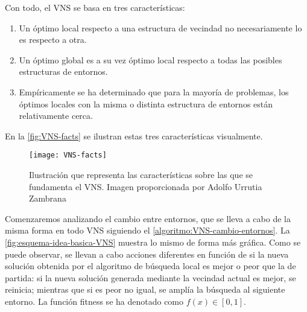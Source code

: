 
Con todo, el VNS se basa en tres características:

\begin{enumerate}
    \item Un óptimo local respecto a una estructura de vecindad no necesariamente lo es respecto a otra.
    \item Un óptimo global es a su vez óptimo local respecto a todas las posibles estructuras de entornos.
    \item Empíricamente se ha determinado que para la mayoría de problemas, los óptimos locales con la misma o distinta estructura de entornos están relativamente cerca.
\end{enumerate}

En la \autoref{fig:VNS-facts} se ilustran estas tres características visualmente.

\begin{figure}
    \centering
    \texttt{[image: VNS-facts]}
    \caption[Ilustración que representa las características sobre las que se fundamenta el VNS]{Ilustración que representa las características sobre las que se fundamenta el VNS. Imagen proporcionada por Adolfo Urrutia Zambrana}
    \label{fig:VNS-facts}
\end{figure}

Comenzaremos analizando el cambio entre entornos, que se lleva a cabo de la misma forma en todo VNS siguiendo el \autoref{algoritmo:VNS-cambio-entornos}. La \autoref{fig:esquema-idea-basica-VNS} muestra lo mismo de forma más gráfica.
Como se puede observar, se llevan a cabo acciones diferentes en función de si la nueva solución obtenida por el algoritmo de búsqueda local es mejor o peor que la de partida: si la nueva solución generada mediante la vecindad actual es mejor, se reinicia; mientras que si es peor no igual, se amplía la búsqueda al siguiente entorno. La función fitness se ha denotado como $f(x) \in [0,1]$.

